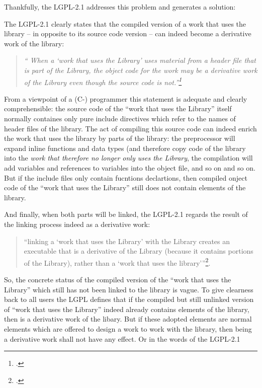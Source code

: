 Thankfully, the LGPL-2.1 addresses this problem and generates a solution:

The LGPL-2.1 clearly states that the compiled version of a work that uses the
library -- in opposite to its source code version -- can indeed become a
derivative work of the library: 

\begin{quote}\emph{\enquote{ When a \enquote{work that uses the Library} uses
material from a header file that is part of the Library, the object code for the
work may be a derivative work of the Library even though the source code is
not.}\footcite[cf.][\nopage wp §5]{Lgpl21OsiLicense1999a} }
\end{quote}

From a viewpoint of a (C-) programmer this statement is adequate and clearly
comprehensible: the source code of the \enquote{work that uses the Library}
itself normally containes only pure include directives which refer to the names
of header files of the library. The act of compiling this source code can indeed 
enrich the work that uses the library by parts of the library: the preprocessor
will expand inline functions and data types (and therefore copy code of the
library into the \emph{work that therefore no longer only uses the Library}, the
compilation will add variables and references to variables into the object file,
and so on and so on. But if the include files only contain
fucntions declartions, then compiled onject code of the \enquote{work that uses
the Library} still does not contain elements of the library.

And finally, when both parts will be linked, the LGPL-2.1 regards the
result of the linking process indeed as a derivative work:
\begin{quote}\enquote{linking a \enquote{work that uses the Library} with the
Library creates an executable that is a derivative of the Library (because it
contains portions of the Library), rather than a \enquote{work that uses the
library}}\footcite[cf.][\nopage wp §5]{Lgpl21OsiLicense1999a}.
\end{quote}

So, the concrete status of the compiled version of the \enquote{work that uses
the Library} which still has not been linked to the library is vague. To give
clearness back to all users the LGPL defines that if the compiled but still
unlinked version of \enquote{work that uses the Library} indeed already contains
elements of the library, then is a derivative work of the libary. But if these
adopted elements are normal elements which are offered to design a work to work
with the library, then being a derivative work shall not have any effect. Or in
the words of the LGPL-2.1

